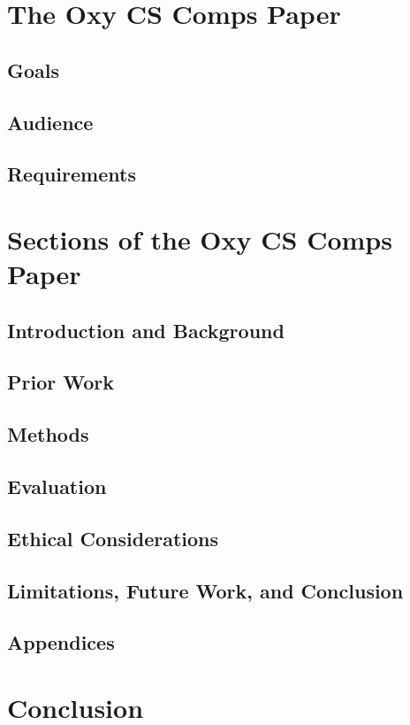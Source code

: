 \documentclass[10pt,twocolumn]{article}
\begin{document}
\section{The Oxy CS Comps Paper}

\subsection{Goals}

\subsection{Audience}

\subsection{Requirements}

\section{Sections of the Oxy CS Comps Paper}

\subsection{Introduction and Background}

\subsection{Prior Work}

\subsection{Methods}

\subsection{Evaluation}

\subsection{Ethical Considerations}

\subsection{Limitations, Future Work, and Conclusion}

\subsection{Appendices}

\section{Conclusion}

\printbibliography 
\end{document}
